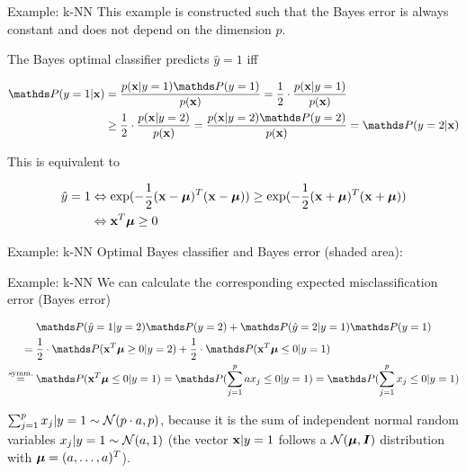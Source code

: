 \documentclass[11pt,compress,t,notes=noshow, xcolor=table]{beamer}
\begin{document}
\begin{framev}{Example: k-NN}
This example is constructed such that the Bayes error is always constant and does not depend on the dimension $p$.

\vfill

The Bayes optimal classifier predicts $\hat y = 1$ iff

\begin{footnotesize}
  \begin{align*}
  \P(y = 1 | \xv) &= \frac{p(\xv | y = 1)\P(y = 1)}{p(\xv)} = \frac{1}{2} \cdot \frac{p(\xv | y = 1)}{p(\xv)} \\
  &\ge \frac{1}{2} \cdot \frac{p(\xv | y = 2)}{p(\xv)} = \frac{p(\xv | y = 2)\P(y = 2)}{p(\xv)} = \P(y = 2 | \xv)
  \end{align*}
\end{footnotesize}

This is equivalent to

\begin{footnotesize}
  \begin{align*}
  \hat y = 1 &\Leftrightarrow \exp(-\frac{1}{2} (\mathbf{x} - \bm{\mu})^T (\mathbf{x} - \bm{\mu})) \ge \exp(-\frac{1}{2} (\mathbf{x} + \bm{\mu})^T (\mathbf{x} + \bm{\mu})) \\
  &\Leftrightarrow \mathbf{x}^T \bm{\mu} \ge 0
  \end{align*}
\end{footnotesize}
\vfill
\end{framev}

\begin{framev}{Example: k-NN}
Optimal Bayes classifier and Bayes error (shaded area):

\vfill


\vfill
\end{framev}

\begin{framev}{Example: k-NN}
We can calculate the corresponding expected misclassification error (Bayes error)

\begin{footnotesize}
\begin{align*}
& \P(\hat y = 1 | y = 2)\P(y = 2) + \P(\hat y = 2 | y = 1)\P(y = 1) \\
={}& \frac{1}{2} \cdot \P(\xv^T \muv \ge 0 | y = 2) + \frac{1}{2} \cdot \P(\xv^T \muv \le 0 | y = 1) \\
\overset{\text{symm.}}{=}{}& \P(\xv^T \muv \le 0 | y = 1) = \P(\sumjp a x_j \le 0 | y = 1) = \P(\sumjp x_j \le 0 | y = 1)
\end{align*}
\end{footnotesize}

$\sum_{j=1}^p x_j | y = 1 \sim \mathcal{N}(p \cdot a, p)$, because it is the sum of independent normal random variables $x_j | y = 1 \sim \mathcal{N}(a, 1)$ (the vector $\mathbf{x} | y = 1$ follows a $\mathcal{N}(\bm{\mu}, \boldsymbol{I})$ distribution with $\bm{\mu} = (a, \ldots, a)^T$).
\vfill
\end{framev}
\end{document}
